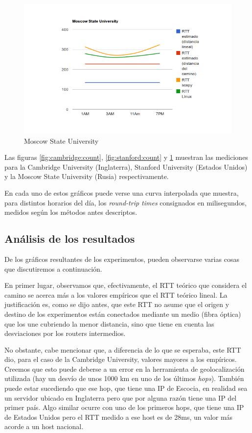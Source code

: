 \begin{figure}[h!]
    \centering
    \includegraphics[width=400pt]{msu.png}
    \caption{Moscow State University}
    \label{fig:msu:count}
\end{figure}

Las figuras \ref{fig:cambridge:count}, \ref{fig:stanford:count} y
\ref{fig:msu:count} muestran las mediciones para la Cambridge University
(Inglaterra), Stanford University (Estados Unidos) y la Moscow State
University (Rusia) respectivamente.

En cada uno de estos gráficos puede verse una curva interpolada que muestra,
para distintos horarios del día, los \emph{round-trip times} consignados en
milisegundos, medidos según los métodos antes descriptos.

\subsection{Análisis de los resultados}
De los gráficos resultantes de los experimentos, pueden observarse varias
cosas que discutiremos a continuación.

En primer lugar, observamos que, efectivamente, el RTT teórico que considera
el camino se acerca más a los valores empíricos que el RTT teórico lineal. La
justificación es, como se dijo antes, que este RTT no asume que el origen y
destino de los experimentos están conectados mediante un medio (fibra óptica)
que los une cubriendo la menor distancia, sino que tiene en cuenta las
desviaciones por los routers intermedios.

No obstante, cabe mencionar que, a diferencia de lo que se esperaba, este RTT
dio, para el caso de la Cambridge University, valores mayores a los empíricos.
Creemos que esto puede deberse a un error en la herramienta de geolocalización
utilizada (hay un desvío de unos 1000 km en uno de los últimos \emph{hops}).
También puede estar sucediendo que ese hop, que tiene una IP de Escocia, en
realidad sea un servidor ubicado en Inglaterra pero que por alguna razón tiene
una IP del primer país. Algo similar ocurre con uno de los primeros hops, que
tiene una IP de Estados Unidos pero el RTT medido a ese host es de 28ms, un
valor más acorde a un host nacional.

